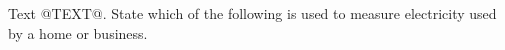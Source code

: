 Text @TEXT@. State which of the following is used to measure 
electricity used 
by a home or business.